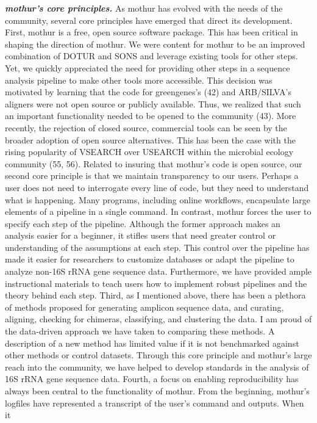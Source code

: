 \documentclass[11pt,]{article}
\begin{document}
\textbf{\emph{mothur's core principles.}} As mothur has evolved with the
needs of the community, several core principles have emerged that direct
its development. First, mothur is a free, open source software package.
This has been critical in shaping the direction of mothur. We were
content for mothur to be an improved combination of DOTUR and SONS and
leverage existing tools for other steps. Yet, we quickly appreciated the
need for providing other steps in a sequence analysis pipeline to make
other tools more accessible. This decision was motivated by learning
that the code for greengenes's (42) and ARB/SILVA's aligners were not
open source or publicly available. Thus, we realized that such an
important functionality needed to be opened to the community (43). More
recently, the rejection of closed source, commercial tools can be seen
by the broader adoption of open source alternatives. This has been the
case with the rising popularity of VSEARCH over USEARCH within the
microbial ecology community (55, 56). Related to insuring that mothur's
code is open source, our second core principle is that we maintain
transparency to our users. Perhaps a user does not need to interrogate
every line of code, but they need to understand what is happening. Many
programs, including online workflows, encapsulate large elements of a
pipeline in a single command. In contrast, mothur forces the user to
specify each step of the pipeline. Although the former approach makes an
analysis easier for a beginner, it stifles users that need greater
control or understanding of the assumptions at each step. This control
over the pipeline has made it easier for researchers to customize
databases or adapt the pipeline to analyze non-16S rRNA gene sequence
data. Furthermore, we have provided ample instructional materials to
teach users how to implement robust pipelines and the theory behind each
step. Third, as I mentioned above, there has been a plethora of methods
proposed for generating amplicon sequence data, and curating, aligning,
checking for chimeras, classifying, and clustering the data. I am proud
of the data-driven approach we have taken to comparing these methods. A
description of a new method has limited value if it is not benchmarked
against other methods or control datasets. Through this core principle
and mothur's large reach into the community, we have helped to develop
standards in the analysis of 16S rRNA gene sequence data. Fourth, a
focus on enabling reproducibility has always been central to the
functionality of mothur. From the beginning, mothur's logfiles have
represented a transcript of the user's command and outputs. When it
\end{document}
